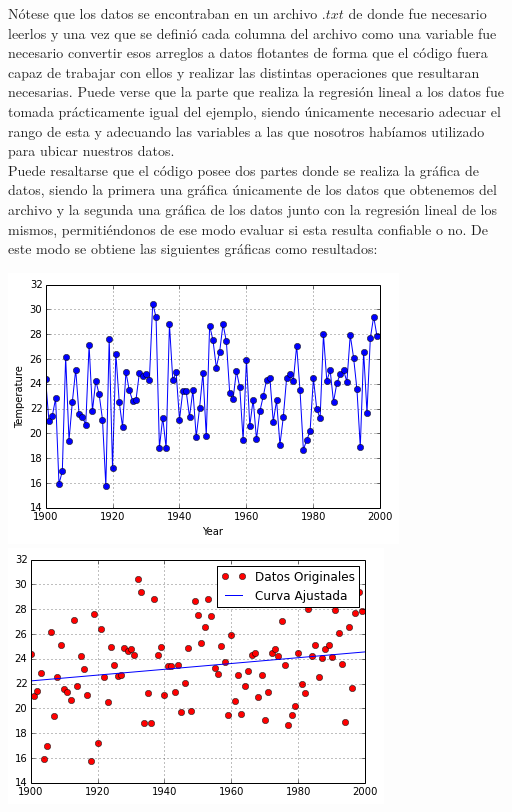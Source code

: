 \documentclass[12pt]{article}
\begin{document}
Nótese que los datos se encontraban en un archivo $.txt$ de donde fue necesario leerlos y una vez que se definió cada columna del archivo como una variable fue necesario convertir esos arreglos a datos flotantes de forma que el código fuera capaz de trabajar con ellos y realizar las distintas operaciones que resultaran necesarias. Puede verse que la parte que realiza la regresión lineal a los datos fue tomada prácticamente igual del ejemplo, siendo únicamente necesario adecuar el rango de esta y adecuando las variables a las que nosotros habíamos utilizado para ubicar nuestros datos.\\
Puede resaltarse que el código posee dos partes donde se realiza la gráfica de datos, siendo la primera una gráfica únicamente de los datos que obtenemos del archivo y la segunda una gráfica de los datos junto con la regresión lineal de los mismos, permitiéndonos de ese modo evaluar si esta resulta confiable o no. De este modo se obtiene las siguientes gráficas como resultados:

\begin{center}
\includegraphics{4a.png}
\includegraphics{4aa.png}
\end{center}
\pagebreak
\end{document}
